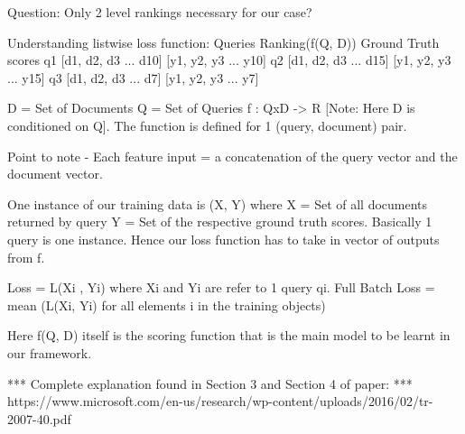\documentclass[11pt]{report}
\begin{document}
    Question: Only 2 level rankings necessary for our case?

Understanding listwise loss function:
    Queries       Ranking(f(Q, D))      Ground Truth scores
    q1        [d1, d2, d3 ... d10]      [y1, y2, y3 ... y10]
    q2        [d1, d2, d3 ... d15]      [y1, y2, y3 ... y15]
    q3        [d1, d2, d3 ... d7]       [y1, y2, y3 ... y7]

    D = {Set of Documents}
    Q = {Set of Queries}
    f : QxD -> R [Note: Here D is conditioned on Q]. The function is defined for 1 (query, document) pair.

    Point to note - Each feature input = a concatenation of the query vector and the document vector.

    One instance of our training data is (X, Y) where X = {Set of all documents returned by query} Y = {Set of the respective ground
    truth scores}. Basically 1 query is one instance. Hence our loss function has to take in vector of outputs from f.

    Loss = L(Xi , Yi) where Xi and Yi are refer to 1 query qi.
    Full Batch Loss = mean (L(Xi, Yi) for all elements i in the training objects)

    Here f(Q, D) itself is the scoring function that is the main model to be learnt in our framework.

    *** Complete explanation found in Section 3 and Section 4 of paper:
        *** https://www.microsoft.com/en-us/research/wp-content/uploads/2016/02/tr-2007-40.pdf
\end{document}
